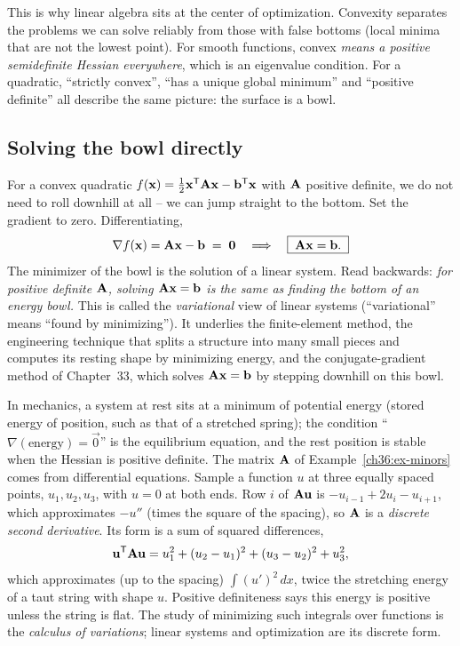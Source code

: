 \begin{aestheticbox}
This is why linear algebra sits at the center of optimization. Convexity separates the
problems we can solve reliably from those with false bottoms (local minima that are
not the lowest point). For smooth functions, convex \emph{means a positive
semidefinite Hessian everywhere}, which is an eigenvalue condition. For a quadratic,
``strictly convex'', ``has a unique global minimum'' and ``positive definite'' all
describe the same picture: the surface is a bowl.
\end{aestheticbox}

\subsection{Solving the bowl directly}

For a convex quadratic $f(\mathbf{x})=\tfrac12\mathbf{x}^{\mathsf{T}}\mathbf{A}\mathbf{x}-\mathbf{b}^{\mathsf{T}}\mathbf{x}$
with $\mathbf{A}$ positive definite, we do not need to roll downhill at all -- we can
jump straight to the bottom. Set the gradient to zero. Differentiating,
\[
  \nabla f(\mathbf{x}) = \mathbf{A}\mathbf{x} - \mathbf{b} \;=\; \mathbf{0}
  \quad\Longrightarrow\quad \boxed{\;\mathbf{A}\mathbf{x} = \mathbf{b}.\;}
\]
The minimizer of the bowl is the solution of a linear system. Read backwards:
\emph{for positive definite $\mathbf{A}$, solving $\mathbf{A}\mathbf{x}=\mathbf{b}$ is the same as
finding the bottom of an energy bowl.} This is called the \emph{variational} view of
linear systems (``variational'' means ``found by minimizing''). It underlies the
finite-element method, the engineering technique that splits a structure into many
small pieces and computes its resting shape by minimizing energy, and the
conjugate-gradient method of Chapter~33, which solves $\mathbf{A}\mathbf{x}=\mathbf{b}$ by
stepping downhill on this bowl.

\begin{connectionbox}
In mechanics, a system at rest sits at a minimum of potential energy (stored energy
of position, such as that of a stretched spring); the condition
``$\nabla(\text{energy})=\vec{0}$'' is the equilibrium equation, and the rest position
is stable when the Hessian is positive definite. The matrix $\mathbf{A}$ of
Example~\ref{ch36:ex-minors} comes from differential equations. Sample a function $u$
at three equally spaced points, $u_1,u_2,u_3$, with $u=0$ at both ends. Row $i$ of
$\mathbf{A}\mathbf{u}$ is $-u_{i-1}+2u_i-u_{i+1}$, which approximates $-u''$ (times the
square of the spacing), so $\mathbf{A}$ is a \emph{discrete second derivative}. Its form
is a sum of squared differences,
\[
  \mathbf{u}^{\mathsf{T}}\mathbf{A}\mathbf{u} = u_1^2 + (u_2-u_1)^2 + (u_3-u_2)^2 + u_3^2,
\]
which approximates (up to the spacing) $\int (u')^2\,dx$, twice the stretching energy
of a taut string with shape $u$. Positive definiteness says this energy is positive unless the
string is flat. The study of minimizing such integrals over functions is the
\emph{calculus of variations}; linear systems and optimization are its discrete form.
\end{connectionbox}

